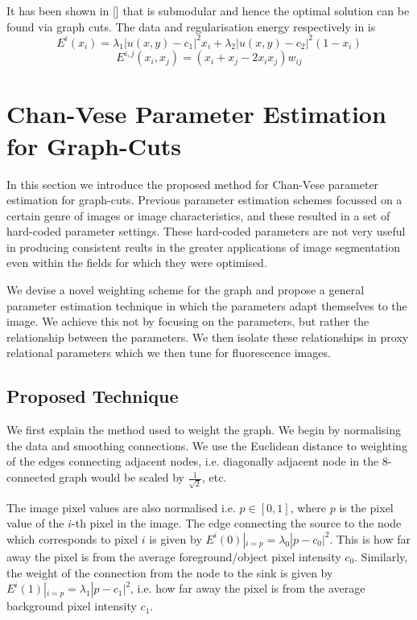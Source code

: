 \documentclass[10pt, journal, letterpaper, onecolumn, draftcls]{IEEEtran}
\begin{document}
It has been shown in [] that  is submodular and hence the optimal solution can be found via graph cuts. The data and regularisation energy respectively in  is
\begin{equation}
	E^i(x_i) = \lambda_1 |u(x,y)-c_1|^2 x_i + \lambda_2 |u(x,y)-c_2|^2 (1-x_i)
\end{equation}
\begin{equation}
	E^{i,j}(x_i,x_j) = (x_i + x_j - 2x_ix_j)w_{ij}
\end{equation}

\section{Chan-Vese Parameter Estimation for Graph-Cuts}
In this section we introduce the proposed method for Chan-Vese parameter estimation for graph-cuts. Previous parameter estimation schemes focussed on a certain genre of images or image characteristics, and these resulted in a set of hard-coded parameter settings. These hard-coded parameters are not very useful in producing consistent reults in the greater applications of image segmentation even within the fields for which they were optimised.

We devise a novel weighting scheme for the graph and propose a general parameter estimation technique in which the parameters adapt themselves to the image. We achieve this not by focusing on the parameters, but rather the relationship between the parameters. We then isolate these relationships in proxy relational parameters which we then tune for fluorescence images.

\subsection{Proposed Technique}
We first explain the method used to weight the graph. We begin by normalising the data and smoothing connections. We use the Euclidean distance to weighting of the edges connecting adjacent nodes, i.e. diagonally adjacent node in the 8-connected graph would be scaled by $\frac{1}{\sqrt{2}}$, etc.

The image pixel values are also normalised i.e. $p \in [0,1]$, where $p$ is the pixel value of the $i$-th pixel in the image. The edge connecting the source to the node which corresponds to pixel $i$ is given by  $E^i(0)|_{i=p} = \lambda_0|p-c_0|^2$. This is how far away the pixel is from the average foreground/object pixel intensity $c_0$.  Similarly, the weight of the connection from the node to the sink is given by $E^i(1)|_{i=p}=\lambda_1|p-c_1|^2$, i.e. how far away the pixel is from the average background pixel intensity $c_1$.
\end{document}
